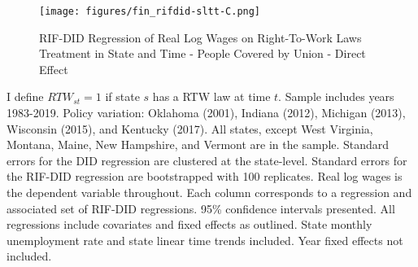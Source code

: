 \documentclass[11pt]{article}
\begin{document}
{\pagebreak
\begin{landscape}
\begin{figure}[ht!]
\centering
    \caption{RIF-DID Regression of Real Log Wages on Right-To-Work Laws Treatment in State and Time - People Covered by Union - Direct Effect}\label{fig:rifdid-sltt-C}
    \texttt{[image: figures/fin\_rifdid-sltt-C.png]}
\end{figure}
\footnotesize{I define $RTW_{st} = 1$ if state $s$ has a RTW law at time $t$. Sample includes years 1983-2019. Policy variation: Oklahoma (2001), Indiana (2012), Michigan (2013), Wisconsin (2015), and Kentucky (2017). All states, except West Virginia, Montana, Maine, New Hampshire, and Vermont are in the sample. Standard errors for the DID regression are clustered at the state-level. Standard errors for the RIF-DID regression are bootstrapped with 100 replicates. Real log wages is the dependent variable throughout. Each column corresponds to a regression and associated set of RIF-DID regressions. 95\% confidence intervals presented. All regressions include covariates and fixed effects as outlined. State monthly unemployment rate and state linear time trends included. Year fixed effects not included.}
\end{landscape}

}
\end{document}
